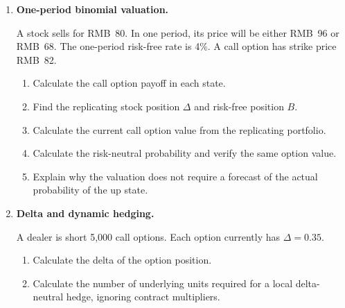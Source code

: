 \begin{enumerate}
\begin{enumerate}

\item Use put--call parity to calculate the price of the corresponding European put.

\item Construct the two portfolios implied by put--call parity and compare their maturity payoffs when the stock price is RMB~40 and RMB~65.

\item Explain how a material violation of parity could create an arbitrage opportunity under the assumed market conditions.

\end{enumerate}

\item \textbf{One-period binomial valuation.}

A stock sells for RMB~80. In one period, its price will be either RMB~96 or RMB~68. The one-period risk-free rate is 4\%. A call option has strike price RMB~82.

\begin{enumerate}

\item Calculate the call option payoff in each state.

\item Find the replicating stock position \(\Delta\) and risk-free position \(B\).

\item Calculate the current call option value from the replicating portfolio.

\item Calculate the risk-neutral probability and verify the same option value.

\item Explain why the valuation does not require a forecast of the actual probability of the up state.

\end{enumerate}

\item \textbf{Delta and dynamic hedging.}

A dealer is short 5,000 call options. Each option currently has \(\Delta=0.35\).

\begin{enumerate}

\item Calculate the delta of the option position.

\item Calculate the number of underlying units required for a local delta-neutral hedge, ignoring contract multipliers.


\end{enumerate}
\end{enumerate}

